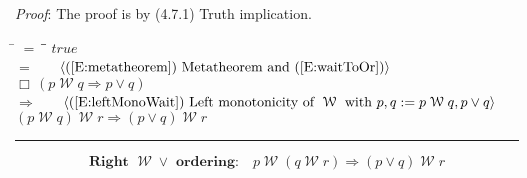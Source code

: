 \documentclass[12pt, fleqn, leqno]{article}
\newcommand{\lgap}{2pt}                             %
\newcommand{\mymathindent}{24pt}                    %
\newcommand{\impl}{\ensuremath{\Rightarrow}}        %
\newcommand{\Until}{\;\mathcal{U}\;}
\newcommand{\Wait}{\;\mathcal{W}\;}
\newcommand{\Always}{\Box\,}
\newcommand{\myqed}{\rule[-.23ex]{1.2ex}{2.0ex}}
\newcommand{\myqedtab}{\hspace{384pt}}              %
\newcommand{\Gll} {\langle}                         %
\newcommand{\Ggg} {\rangle}                         %
\newcommand{\Hint}[1]     {\ \ \ $\Gll              \mbox{#1} \Ggg$ }   %
\begin{document}
\emph{Proof}: The proof is by (4.7.1) Truth implication.
\begin{tabbing}
\hspace{\mymathindent} \= $= \;$ \= \myqedtab \= \kill
  \> \>   $true$\\[\lgap]
  \> $=$ \> \Hint{(\ref{E:metatheorem}) Metatheorem and (\ref{E:waitToOr})} \\[\lgap]
  \> \>   $\Always (p\Wait q\impl p\lor q)$\\[\lgap]
  \> $\impl$  \>  \Hint{(\ref{E:leftMonoWait}) Left monotonicity of $\Wait$ with $p,q := p\Wait q, p\lor q$}\\[\lgap]
  \> \>   $(p \Wait q) \Wait r \impl (p \lor q) \Wait r$ \quad \myqed
\end{tabbing}
%
\begin{equation}\label{E:leftAssocWait}
\textbf{Right $\Wait\lor$ ordering:}\quad p \Wait (q \Wait r) \impl (p \lor q) \Wait r
\end{equation}
\end{document}
